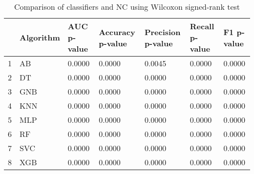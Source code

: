 \begin{table}
\footnotesize
\caption{Comparison of classifiers and NC using Wilcoxon signed-rank test}
\label{tab:wilcoxon comparison}
\begin{tabular}{lllllll}
\hline
 & Algorithm & AUC p-value & Accuracy p-value & Precision p-value & Recall p-value & F1 p-value \\
\hline
1 & AB & 0.0000 & 0.0000 & 0.0045 & 0.0000 & 0.0000 \\
2 & DT & 0.0000 & 0.0000 & 0.0000 & 0.0000 & 0.0000 \\
3 & GNB & 0.0000 & 0.0000 & 0.0000 & 0.0000 & 0.0000 \\
4 & KNN & 0.0000 & 0.0000 & 0.0000 & 0.0000 & 0.0000 \\
5 & MLP & 0.0000 & 0.0000 & 0.0000 & 0.0000 & 0.0000 \\
6 & RF & 0.0000 & 0.0000 & 0.0000 & 0.0000 & 0.0000 \\
7 & SVC & 0.0000 & 0.0000 & 0.0000 & 0.0000 & 0.0000 \\
8 & XGB & 0.0000 & 0.0000 & 0.0000 & 0.0000 & 0.0000 \\
\hline
\end{tabular}
\end{table}
